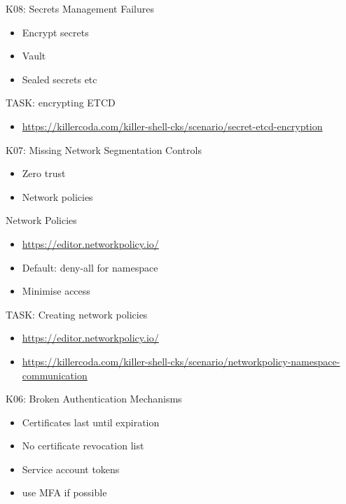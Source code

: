 \documentclass{dcpresentation}
\begin{document}

\begin{frame}{K08: Secrets Management Failures}
  \begin{itemize}
  \item Encrypt secrets
  \item Vault
  \item Sealed secrets etc
  \end{itemize}
\end{frame}

\begin{frame}{TASK: encrypting ETCD}
 \begin{itemize}
  \item \url{https://killercoda.com/killer-shell-cks/scenario/secret-etcd-encryption}
 \end{itemize}
\end{frame}

\begin{frame}{K07: Missing Network Segmentation Controls}
  \begin{itemize}
  \item Zero trust 
  \item Network policies
  \end{itemize}
\end{frame}

\begin{frame}{Network Policies}
  \begin{itemize}
  \item \url{https://editor.networkpolicy.io/}
  \item Default: deny-all for namespace
  \item Minimise access
  \end{itemize}
\end{frame}
 
\begin{frame}{TASK: Creating network policies}
 \begin{itemize}
   \item \url{https://editor.networkpolicy.io/}
   \item \url{https://killercoda.com/killer-shell-cks/scenario/networkpolicy-namespace-communication}
 \end{itemize}
\end{frame}  
 


\begin{frame}{K06: Broken Authentication Mechanisms}
  \begin{itemize}
    \item Certificates last until expiration
      \item No certificate revocation list
    \item Service account tokens
    \item use MFA if possible
  \end{itemize}
\end{frame}
\end{document}
